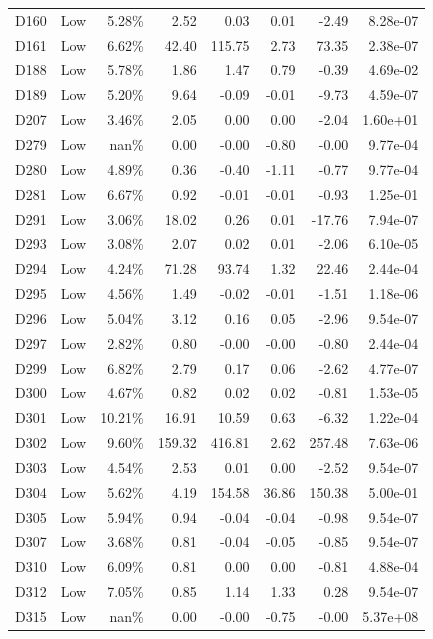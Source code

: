\begin{tabular}{l l r r r r r r}
D160 & Low & 5.28\% & 2.52 & 0.03 & 0.01 & -2.49 & 8.28e-07 \\
D161 & Low & 6.62\% & 42.40 & 115.75 & 2.73 & 73.35 & 2.38e-07 \\
D188 & Low & 5.78\% & 1.86 & 1.47 & 0.79 & -0.39 & 4.69e-02 \\
D189 & Low & 5.20\% & 9.64 & -0.09 & -0.01 & -9.73 & 4.59e-07 \\
D207 & Low & 3.46\% & 2.05 & 0.00 & 0.00 & -2.04 & 1.60e+01 \\
D279 & Low & nan\% & 0.00 & -0.00 & -0.80 & -0.00 & 9.77e-04 \\
D280 & Low & 4.89\% & 0.36 & -0.40 & -1.11 & -0.77 & 9.77e-04 \\
D281 & Low & 6.67\% & 0.92 & -0.01 & -0.01 & -0.93 & 1.25e-01 \\
D291 & Low & 3.06\% & 18.02 & 0.26 & 0.01 & -17.76 & 7.94e-07 \\
D293 & Low & 3.08\% & 2.07 & 0.02 & 0.01 & -2.06 & 6.10e-05 \\
D294 & Low & 4.24\% & 71.28 & 93.74 & 1.32 & 22.46 & 2.44e-04 \\
D295 & Low & 4.56\% & 1.49 & -0.02 & -0.01 & -1.51 & 1.18e-06 \\
D296 & Low & 5.04\% & 3.12 & 0.16 & 0.05 & -2.96 & 9.54e-07 \\
D297 & Low & 2.82\% & 0.80 & -0.00 & -0.00 & -0.80 & 2.44e-04 \\
D299 & Low & 6.82\% & 2.79 & 0.17 & 0.06 & -2.62 & 4.77e-07 \\
D300 & Low & 4.67\% & 0.82 & 0.02 & 0.02 & -0.81 & 1.53e-05 \\
D301 & Low & 10.21\% & 16.91 & 10.59 & 0.63 & -6.32 & 1.22e-04 \\
D302 & Low & 9.60\% & 159.32 & 416.81 & 2.62 & 257.48 & 7.63e-06 \\
D303 & Low & 4.54\% & 2.53 & 0.01 & 0.00 & -2.52 & 9.54e-07 \\
D304 & Low & 5.62\% & 4.19 & 154.58 & 36.86 & 150.38 & 5.00e-01 \\
D305 & Low & 5.94\% & 0.94 & -0.04 & -0.04 & -0.98 & 9.54e-07 \\
D307 & Low & 3.68\% & 0.81 & -0.04 & -0.05 & -0.85 & 9.54e-07 \\
D310 & Low & 6.09\% & 0.81 & 0.00 & 0.00 & -0.81 & 4.88e-04 \\
D312 & Low & 7.05\% & 0.85 & 1.14 & 1.33 & 0.28 & 9.54e-07 \\
D315 & Low & nan\% & 0.00 & -0.00 & -0.75 & -0.00 & 5.37e+08 \\

\end{tabular}
